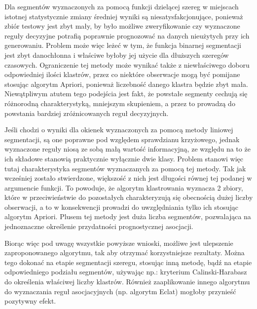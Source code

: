 \documentclass[polish, twoside, 12pt, a4paper]{article}
\theoremstyle{definition}
\theoremstyle{plain}
\theoremstyle{remark}
\begin{document}
Dla segmentów wyznaczonych za pomocą funkcji dzielącej szereg w miejscach istotnej statystycznie zmiany średniej wyniki są niesatysfakcjonujące, ponieważ zbiór testowy jest zbyt mały, by było 
możliwe zweryfikowanie czy wyznaczone reguły decyzyjne potrafią poprawnie prognozować na danych nieużytych przy ich generowaniu. Problem może więc leżeć w tym, że 
funkcja binarnej segmentacji jest zbyt danochłonna i właściwe byłoby jej użycie dla dłuższych szeregów czasowych. Ograniczenie tej metody może wynikać także z niewłaściwego 
doboru odpowiedniej ilości klastrów, przez co niektóre obserwacje mogą być pomijane stosując algorytm Apriori, ponieważ liczebność danego klastra będzie zbyt mała. Niewątpliwym 
atutem tego podejścia jest fakt, że powstałe segmenty cechują się różnorodną charakterystyką, mniejszym skupieniem, a przez to prowadzą do powstania bardziej zróżnicowanych 
reguł decyzyjnych.

Jeśli chodzi o wyniki dla okienek wyznaczonych za pomocą metody liniowej segmentacji, są one poprawne pod względem sprawdzianu krzyżowego, jednak wyznaczone reguły 
niosą ze sobą małą wartość informacyjną, ze względu na to że ich składowe stanowią praktycznie wyłącznie dwie klasy. Problem stanowi więc tutaj charakterystyka segmentów 
wyznaczanych za pomocą tej metody. Tak jak wcześniej zostało stwierdzone, większość z nich jest długości równej tej podanej w argumencie funkcji. To powoduje, że algorytm 
klastrowania wyznacza 2 zbiory, które w przeciwieństwie do pozostałych charakteryzują się obecnością dużej liczby obserwacji, a to w konsekwencji prowadzi do uwzględniania 
tylko ich stosując algorytm Apriori. Plusem tej metody jest duża liczba segmentów, pozwalająca na jednoznaczne określenie przydatności prognostycznej asocjacji.

Biorąc więc pod uwagę wszystkie powyższe wnioski, możliwe jest ulepszenie zaproponowanego algorytmu, tak aby otrzymać korzystniejsze rezultaty. Można tego dokonać na 
etapie segmentacji szeregu, stosując inną metodę, bądź na etapie odpowiedniego podziału segmentów, używając np.: kryterium Calinski-Harabasz do określenia właściwej liczby 
klastrów. Również zaaplikowanie innego algorytmu do wyznaczania reguł asocjacyjnych (np. algorytm Eclat) mogłoby przynieść pozytywny efekt.

\appendix


\clearpage
\end{document}
